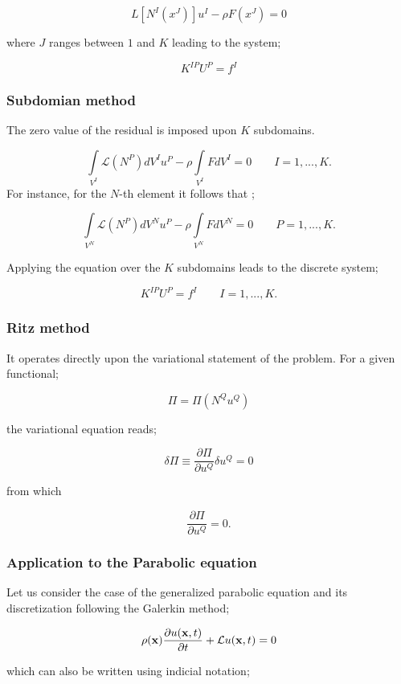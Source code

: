 \[L[{N^I}({x^J})]{u^I} - \rho F({x^J}) = 0\]

where $J$ ranges between $1$ and $K$ leading to the system;

\begin{equation}
{K^{IP}}{U^P} = {f^I}
\label{DColo}
\end{equation}

\subsubsection{Subdomian method}
The zero value of the residual is imposed upon $K$ subdomains.

\[\int\limits_{{V^I}} {\mathcal{L}({N^P})d{V^I}{u^P}}  - \rho \int\limits_{{V^I}} {Fd{V^I}}  = 0 \quad \quad I=1,...,K.\] For instance, for the $N$-th element it follows that ;

\[\int\limits_{{V^N}} {\mathcal{L}({N^P})d{V^N}{u^P}}  - \rho \int\limits_{{V^N}} {Fd{V^N}}  = 0 \quad \quad P=1,...,K.\]

Applying the equation over the $K$ subdomains leads to the discrete system;


\begin{equation}
{K^{IP}}{U^P} = {f^I} \quad \quad I=1,...,K.
\label{DColo}
\end{equation}

\subsubsection{Ritz method} It operates directly upon the variational statement of the problem. For a given functional;

\[\Pi  = \Pi ({N^Q}{u^Q})\]

the variational equation reads;

\[\delta \Pi  \equiv \frac{{\partial \Pi }}{{\partial {u^Q}}}\delta {u^Q} = 0\]

from which

\[\frac{{\partial \Pi }}{{\partial {u^Q}}} = 0.\]

\subsubsection*{Application to the Parabolic equation}
Let us consider the case of the generalized parabolic equation and its discretization following the Galerkin method;

\[\rho(\vb x) \pdv{u(\vb x,t)}{t} + \mathcal{L}u(\vb x, t) = 0\]

which can also be written using indicial notation;

